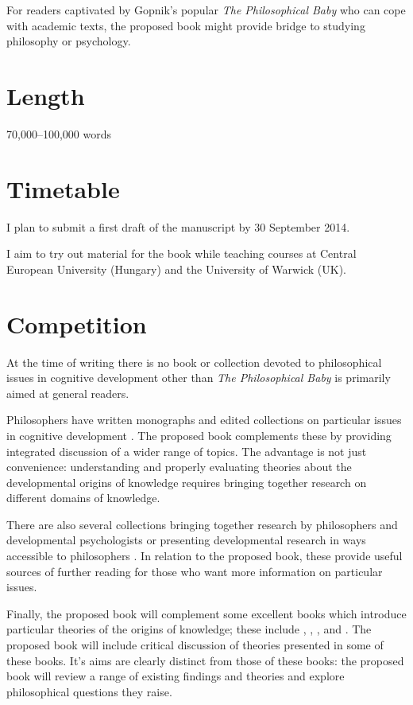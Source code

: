 \documentclass[12pt,\papersize]{extarticle}
\begin{document}
For readers captivated by Gopnik's popular \textit{The Philosophical Baby} \citep{gopnik:2009_philosophical} who can cope with academic texts, the proposed book might provide bridge to studying philosophy or psychology.



\section{Length}
70,000--100,000 words


\section{Timetable}
I plan to submit a first draft of the manuscript by 30 September 2014.  

I aim to try out material for the book while teaching courses at  Central European University (Hungary) and the University of Warwick (UK).



\section{Competition}
At the time of writing there is no book or collection devoted to philosophical issues in cognitive development other than \textit{The Philosophical Baby} \citep{gopnik:2009_philosophical}  is primarily aimed at general readers.

Philosophers have written monographs and edited collections on particular issues in cognitive development \citep[e.g.][]{Bermudez:2003dj,carruthers:1996_theories}.  
The proposed book complements these by providing integrated discussion of a wider range of topics. 
The advantage is not just convenience: understanding and properly evaluating theories about the developmental origins of knowledge requires bringing together research on different domains of knowledge.

There are also several collections bringing together research by philosophers and developmental psychologists or presenting developmental research in ways accessible to philosophers 
\citep[e.g.][]{Whiten:1991qn,hirschfeld:1994_mapping,carruthers:2005_innate_structure,carruthers:2006_innate_culture,hoerl:2011_understanding}.
In relation to the proposed book, these provide useful sources of further reading for those who want more information on particular issues.

Finally, the proposed book will complement some excellent books which introduce particular theories of the origins of knowledge; these include 
	\citet{Elman:1996zd},
	\citet{Gopnik:1997xq},
	\citet{Tomasello:1999xz},
	and
	\citet{carey:2009_origin}.
The proposed book will include critical discussion of theories presented in some of these  books.  
It's aims are clearly distinct from those of these books: the proposed book will review a range of existing findings and theories and explore philosophical questions they raise.  
\end{document}
